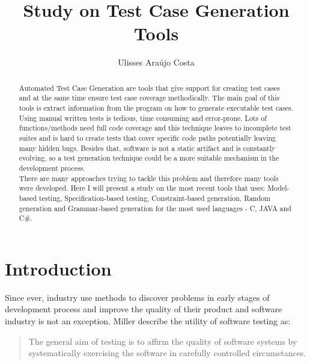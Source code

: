 \documentclass{llncs}
\title{Study on Test Case Generation Tools}
\author{Ulisses Araújo Costa}
\institute{Department of Informatics, University of Minho\\ Campus de Gualtar, 4710-057 Braga, Portugal\\
\email{ulissesmonhecosta@gmail.com}
}
\begin{document}
\maketitle
\begin{abstract}
Automated Test Case Generation are tools that give support for creating test cases and at the same time ensure test case coverage methodically.
The main goal of this tools is extract information from the program on how to generate executable test cases.\\
Using  manual written tests is tedious, time consuming and error-prone. Lots of functions/methods need full code coverage and this technique leaves
to incomplete test suites and is hard to create tests that cover specific code paths potentially leaving many hidden bugs.
Besides that, software is not a static artifact and is constantly evolving, so a test generation technique could be a more suitable mechanism in the development process.\\
There are many approaches trying to tackle this problem and therefore many tools were developed. Here I will present a study on the most recent tools that uses:
Model-based testing, Specification-based testing, Constraint-based generation, Random generation and Grammar-based generation for the most used languages - C, JAVA and C\#.
\end{abstract}

\section{Introduction}
Since ever, industry use methods to discover problems in early stages of development process and improve
the quality of their product and software industry is not an exception. Miller\cite{miller} describe the utility
of software testing as:

\begin{quotation}
The general aim of testing is to affirm the quality of software systems by systematically
exercising the software in carefully controlled circumstances.
\end{quotation}
\end{document}
